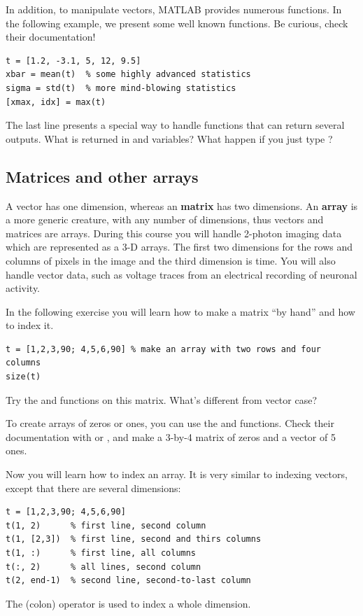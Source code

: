 \documentclass{article}
\begin{document}
In addition, to manipulate vectors, MATLAB provides numerous functions.
In the following example, we present some well known functions.
Be curious, check their documentation!
\begin{lstlisting}
t = [1.2, -3.1, 5, 12, 9.5]
xbar = mean(t)  % some highly advanced statistics
sigma = std(t)  % more mind-blowing statistics
[xmax, idx] = max(t)
\end{lstlisting}
The last line presents a special way to handle functions that can return several outputs.
What is returned in  and  variables?
What happen if you just type ?


\pagebreak
\subsection{Matrices and other arrays}

A vector has one dimension, whereas an \textbf{matrix} has two dimensions.
An \textbf{array} is a more generic creature, with any number of dimensions, thus vectors and matrices are arrays.
During this course you will handle 2-photon imaging data which are represented as a 3-D arrays.
The first two dimensions for the rows and columns of pixels in the image and the third dimension is time.
You will also handle vector data, such as voltage traces from an electrical recording of neuronal activity.

In the following exercise you will learn how to make a matrix ``by hand'' and how to index it.
\begin{lstlisting}
t = [1,2,3,90; 4,5,6,90] % make an array with two rows and four columns
size(t)
\end{lstlisting}
Try the  and  functions on this matrix.
What's different from vector case?

To create arrays of zeros or ones, you can use the  and  functions.
Check their documentation with  or , and make a 3-by-4 matrix of zeros and a vector of 5 ones.

Now you will learn how to index an array.
It is very similar to indexing vectors, except that there are several dimensions:
\begin{lstlisting}
t = [1,2,3,90; 4,5,6,90]
t(1, 2)      % first line, second column
t(1, [2,3])  % first line, second and thirs columns
t(1, :)      % first line, all columns
t(:, 2)      % all lines, second column
t(2, end-1)  % second line, second-to-last column
\end{lstlisting}
The \mcode{:} (colon) operator is used to index a whole dimension.
\end{document}

